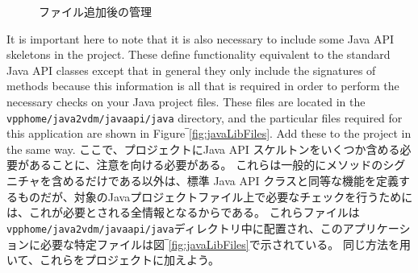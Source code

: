 \documentclass[\pformat,12pt]{jarticle}
\newcommand{\vdmhome}{vpphome}
\begin{document}
\begin{figure}[tbh]
\begin{center}
\caption{ファイル追加後の管理}\label{fig:addedJavaFiles}
\end{center}
\end{figure}

It is important here to note that it is also necessary to include some
Java API skeletons in the project. These define functionality
equivalent to the standard Java API classes except that in general
they only include the signatures of methods because this information
is all that is required in order to perform the necessary checks on
your Java project files. These files are located in the {\tt
  \vdmhome/java2vdm/javaapi/java} directory, and the particular files
required for this application are shown in
Figure‾\ref{fig:javaLibFiles}. Add these to the 
project in the same way.
ここで、プロジェクトにJava API スケルトンをいくつか含める必要があることに、注意を向ける必要がある。
これらは一般的にメソッドのシグニチャを含めるだけである以外は、標準 Java API クラスと同等な機能を定義するものだが、対象のJavaプロジェクトファイル上で必要なチェックを行うためには、これが必要とされる全情報となるからである。
これらファイルは {\tt  \vdmhome/java2vdm/javaapi/java}ディレクトリ中に配置され、このアプリケーションに必要な特定ファイルは図‾\ref{fig:javaLibFiles}で示されている。 
同じ方法を用いて、これらをプロジェクトに加えよう。
\end{document}
